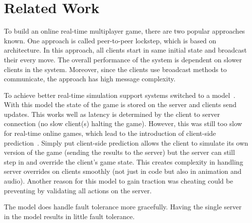 
\section{Related Work}

To build an online real-time multiplayer game, there are two popular approaches known. One approach is called peer-to-peer lockstep, which is based on \ptoP architecture. In this approach, all clients start in same initial state and broadcast their every move. The overall performance of the system is dependent on slower clients in the system. Moreover, since the clients use broadcast methods to communicate, the approach has high message complexity.

To achieve better real-time simulation support systems switched to a \clientServer model~\cite{DOOMfaq}. With this model the state of the game is stored on the server and clients send updates. This works well as latency is determined by the client to server connection (no slow client(s) halting the game). However, this was still too slow for real-time online games, which lead to the introduction of client-side prediction~\cite{bernier2001latency}. Simply put client-side prediction allows the client to simulate its own version of the game (sending the results to the server) but the server can still step in and override the client's game state. This creates complexity in handling server overrides on clients smoothly (not just in code but also in animation and audio). Another reason for this model to gain traction was cheating could be preventing by validating all actions on the server.

The \ptoP model does handle fault tolerance more gracefully. Having the single server in the \clientServer model results in little fault tolerance.
